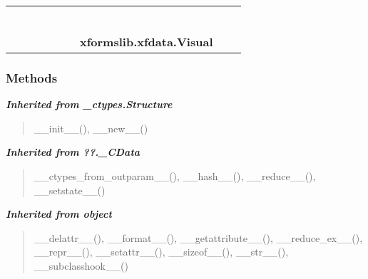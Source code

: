     \label{xformslib:xfdata:Visual}
\begin{tabular}{cccccccccc}
\multicolumn{2}{r}{\settowidth{\BCL}{object}\multirow{2}{\BCL}{object}}
&&
&&
&&
  \\\cline{3-3}
  &&\multicolumn{1}{c|}{}
&&
&&
&&
  \\
\multicolumn{4}{r}{\settowidth{\BCL}{??.\_CData}\multirow{2}{\BCL}{??.\_CData}}
&&
&&
  \\\cline{5-5}
  &&&&\multicolumn{1}{c|}{}
&&
&&
  \\
\multicolumn{6}{r}{\settowidth{\BCL}{\_ctypes.Structure}\multirow{2}{\BCL}{\_ctypes.Structure}}
&&
  \\\cline{7-7}
  &&&&&&\multicolumn{1}{c|}{}
&&
  \\
&&&&&&\multicolumn{2}{l}{\textbf{xformslib.xfdata.Visual}}
\end{tabular}



  \subsubsection{Methods}


\large{\textbf{\textit{Inherited from \_ctypes.Structure}}}

\begin{quote}
\_\_init\_\_(), \_\_new\_\_()
\end{quote}

\large{\textbf{\textit{Inherited from ??.\_CData}}}

\begin{quote}
\_\_ctypes\_from\_outparam\_\_(), \_\_hash\_\_(), \_\_reduce\_\_(), \_\_setstate\_\_()
\end{quote}

\large{\textbf{\textit{Inherited from object}}}

\begin{quote}
\_\_delattr\_\_(), \_\_format\_\_(), \_\_getattribute\_\_(), \_\_reduce\_ex\_\_(), \_\_repr\_\_(), \_\_setattr\_\_(), \_\_sizeof\_\_(), \_\_str\_\_(), \_\_subclasshook\_\_()
\end{quote}


